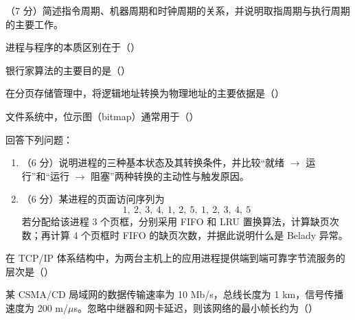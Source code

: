 \documentclass[a4paper,11pt]{article}
\begin{document}

\q （7 分）简述指令周期、机器周期和时钟周期的关系，并说明取指周期与执行周期的主要工作。
\anslines{6cm}



\q 进程与程序的本质区别在于（\quad）

\q 银行家算法的主要目的是（\quad）

\q 在分页存储管理中，将逻辑地址转换为物理地址的主要依据是（\quad）

\q 文件系统中，位示图（bitmap）通常用于（\quad）


\q 回答下列问题：
\begin{enumerate}[label=（\arabic*）, leftmargin=2.4em, itemsep=2pt]
  \item （6 分）说明进程的三种基本状态及其转换条件，并比较“就绪 $\to$ 运行”和“运行 $\to$ 阻塞”两种转换的主动性与触发原因。
  \item （6 分）某进程的页面访问序列为
  \[
  1,\ 2,\ 3,\ 4,\ 1,\ 2,\ 5,\ 1,\ 2,\ 3,\ 4,\ 5
  \]
  若分配给该进程 3 个页框，分别采用 FIFO 和 LRU 置换算法，计算缺页次数；再计算 4 个页框时 FIFO 的缺页次数，并据此说明什么是 Belady 异常。
\end{enumerate}
\anslines{8cm}



\q 在 TCP/IP 体系结构中，为两台主机上的应用进程提供端到端可靠字节流服务的层次是（\quad）

\q 某 CSMA/CD 局域网的数据传输速率为 10 Mb/s，总线长度为 1 km，信号传播速度为 200 m/$\mu$s。忽略中继器和网卡延迟，则该网络的最小帧长约为（\quad）
\end{document}
